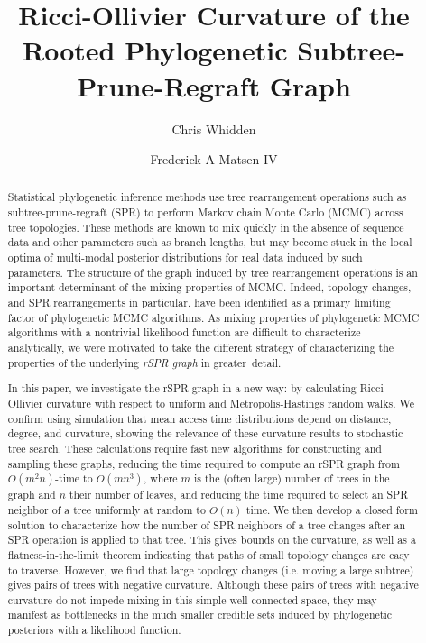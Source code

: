 \documentclass[11pt]{amsart}
\begin{document}
\title{Ricci-Ollivier Curvature of the Rooted Phylogenetic Subtree-Prune-Regraft Graph}

\author{Chris Whidden}
\address{Program in Computational Biology, Fred Hutchinson Cancer Research Center, Seattle, WA 98109}

\author{Frederick A Matsen IV}


\begin{abstract}
Statistical phylogenetic inference methods use tree rearrangement operations such as subtree-prune-regraft (SPR) to perform Markov chain Monte Carlo (MCMC) across tree topologies.
These methods are known to mix quickly in the absence of sequence data and other parameters such as branch lengths, but may become stuck in the local optima of multi-modal posterior distributions for real data induced by such parameters.
The structure of the graph induced by tree rearrangement operations is an important determinant of the mixing properties of MCMC.
Indeed, topology changes, and SPR rearrangements in particular, have been identified as a primary limiting factor of phylogenetic MCMC algorithms.
As mixing properties of phylogenetic MCMC algorithms with a nontrivial likelihood function are difficult to characterize analytically, we were motivated to take the different strategy of characterizing the properties of the underlying \emph{rSPR graph} in greater~detail.

In this paper, we investigate the rSPR graph in a new way: by calculating Ricci-Ollivier curvature with respect to uniform and Metropolis-Hastings random walks.
We confirm using simulation that mean access time distributions depend on distance, degree, and curvature, showing the relevance of these curvature results to stochastic tree search.
These calculations require fast new algorithms for constructing and sampling these graphs, reducing the time required to compute an rSPR graph from $O(m^2n)$-time to $O(mn^3)$, where $m$ is the (often large) number of trees in the graph and $n$ their number of leaves, and reducing the time required to select an SPR neighbor of a tree uniformly at random to $O(n)$ time.
We then develop a closed form solution to characterize how the number of SPR neighbors of a tree changes after an SPR operation is applied to that tree.
This gives bounds on the curvature, as well as a flatness-in-the-limit theorem indicating that paths of small topology changes are easy to traverse.
However, we find that large topology changes (i.e. moving a large subtree) gives pairs of trees with negative curvature.
Although these pairs of trees with negative curvature do not impede mixing in this simple well-connected space, they may manifest as bottlenecks in the much smaller credible sets induced by phylogenetic posteriors with a likelihood function.

\end{abstract}
\end{document}
